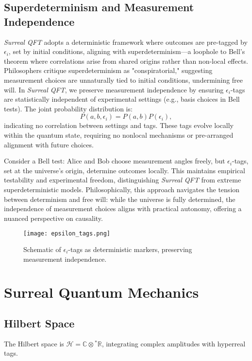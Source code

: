 \documentclass{article}
\begin{document}
\subsection{Superdeterminism and Measurement Independence}
\textit{Surreal QFT} adopts a deterministic framework where outcomes are pre-tagged by \(\epsilon_i\), set by initial conditions, aligning with superdeterminism—a loophole to Bell's theorem where correlations arise from shared origins rather than non-local effects. Philosophers critique superdeterminism as "conspiratorial," suggesting measurement choices are unnaturally tied to initial conditions, undermining free will. In \textit{Surreal QFT}, we preserve measurement independence by ensuring \(\epsilon_i\)-tags are statistically independent of experimental settings (e.g., basis choices in Bell tests). The joint probability distribution is:
\begin{equation}
P(a, b, \epsilon_i) = P(a, b) P(\epsilon_i),
\end{equation}
indicating no correlation between settings and tags. These tags evolve locally within the quantum state, requiring no nonlocal mechanisms or pre-arranged alignment with future choices.

Consider a Bell test: Alice and Bob choose measurement angles freely, but \(\epsilon_i\)-tags, set at the universe's origin, determine outcomes locally. This maintains empirical testability and experimental freedom, distinguishing \textit{Surreal QFT} from extreme superdeterministic models. Philosophically, this approach navigates the tension between determinism and free will: while the universe is fully determined, the independence of measurement choices aligns with practical autonomy, offering a nuanced perspective on causality.

\begin{figure}[h]
    \centering
    \texttt{[image: epsilon\_tags.png]}
    \caption{Schematic of \(\epsilon_i\)-tags as deterministic markers, preserving measurement independence.}
    \label{fig:epsilon_tags}
\end{figure}

\section{Surreal Quantum Mechanics}
\subsection{Hilbert Space}
The Hilbert space is \(\mathcal{H} = \mathbb{C} \otimes {}^*\mathbb{R}\), integrating complex amplitudes with hyperreal tags.
\end{document}
